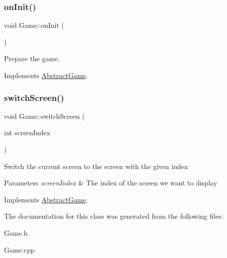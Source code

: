 \subsubsection{\texorpdfstring{on\+Init()}{onInit()}}
{\footnotesize\ttfamily void Game\+::on\+Init (\begin{DoxyParamCaption}{ }\end{DoxyParamCaption})\hspace{0.3cm}{\ttfamily [virtual]}}



Prepare the game. 



Implements \mbox{\hyperlink{class_abstract_game_ae0bd76d926812f81e5e637ade3b1015f}{Abstract\+Game}}.

\mbox{\label{class_game_a0e1dd146112c54290e11d3e5f0a36fdd}} 
\subsubsection{\texorpdfstring{switch\+Screen()}{switchScreen()}}
{\footnotesize\ttfamily void Game\+::switch\+Screen (\begin{DoxyParamCaption}\item[{int}]{screen\+Index }\end{DoxyParamCaption})\hspace{0.3cm}{\ttfamily [virtual]}}



Switch the current screen to the screen with the given index 


\begin{DoxyParams}{Parameters}
{\em screen\+Index} & The index of the screen we want to display\\
\hline
\end{DoxyParams}


Implements \mbox{\hyperlink{class_abstract_game_afd50e09c9b23aff40c752990947f07ce}{Abstract\+Game}}.



The documentation for this class was generated from the following files\+:\begin{DoxyCompactItemize}
\item 
Game.\+h\item 
Game.\+cpp\end{DoxyCompactItemize}
